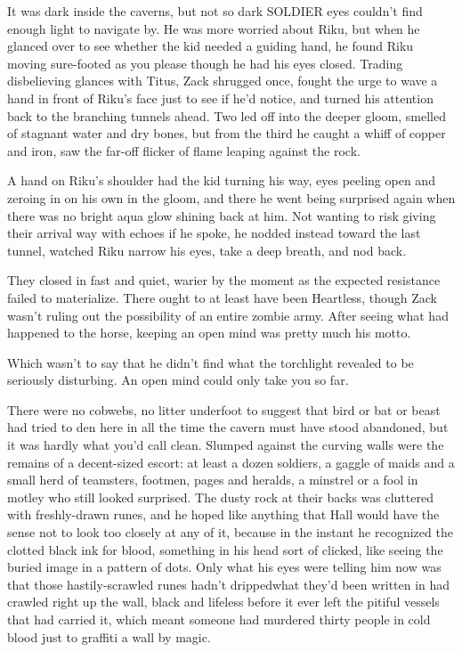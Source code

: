 It was dark inside the caverns, but not so dark SOLDIER eyes couldn't find enough light to navigate by. He was more worried about Riku, but when he glanced over to see whether the kid needed a guiding hand, he found Riku moving sure-footed as you please though he had his eyes closed. Trading disbelieving glances with Titus, Zack shrugged once, fought the urge to wave a hand in front of Riku's face just to see if he'd notice, and turned his attention back to the branching tunnels ahead. Two led off into the deeper gloom, smelled of stagnant water and dry bones, but from the third he caught a whiff of copper and iron, saw the far-off flicker of flame leaping against the rock.

A hand on Riku's shoulder had the kid turning his way, eyes peeling open and zeroing in on his own in the gloom, and there he went being surprised again when there was no bright aqua glow shining back at him. Not wanting to risk giving their arrival way with echoes if he spoke, he nodded instead toward the last tunnel, watched Riku narrow his eyes, take a deep breath, and nod back.

They closed in fast and quiet, warier by the moment as the expected resistance failed to materialize. There ought to at least have been Heartless, though Zack wasn't ruling out the possibility of an entire zombie army. After seeing what had happened to the horse, keeping an open mind was pretty much his motto.

Which wasn't to say that he didn't find what the torchlight revealed to be seriously disturbing. An open mind could only take you so far.

There were no cobwebs, no litter underfoot to suggest that bird or bat or beast had tried to den here in all the time the cavern must have stood abandoned, but it was hardly what you'd call clean. Slumped against the curving walls were the remains of a decent-sized escort: at least a dozen soldiers, a gaggle of maids and a small herd of teamsters, footmen, pages and heralds, a minstrel or a fool in motley who still looked surprised. The dusty rock at their backs was cluttered with freshly-drawn runes, and he hoped like anything that Hall would have the sense not to look too closely at any of it, because in the instant he recognized the clotted black ink for blood, something in his head sort of clicked, like seeing the buried image in a pattern of dots. Only what his eyes were telling him now was that those hastily-scrawled runes hadn't dripped\textemdash what they'd been written in had crawled right up the wall, black and lifeless before it ever left the pitiful vessels that had carried it, which meant someone had murdered thirty people in cold blood just to graffiti a wall by magic.

